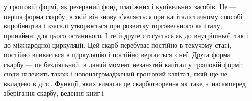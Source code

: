 \parcont{}  %
у грошовій формі, як резервний фонд платіжних і купівельних
засобів. Це — перша форма скарбу, в якій він знову з’являється
при капіталістичному способі виробництва і взагалі утворюється
при розвитку торговельного капіталу, принаймні для цього
останнього. І те й друге стосується як до внутрішньої, так і до
міжнародної циркуляції. Цей скарб перебуває постійно в текучому
стані, постійно вливається в циркуляцію і постійно вертається
з неї. Друга форма скарбу — це бездіяльний, в даний
момент незанятий капітал у грошовій формі; сюди належить
також і новонагромаджений грошовий капітал, який ще не
вкладено в діло. Функції, яких вимагає це скарботворення як
таке, є насамперед зберігання скарбу, ведення книг і~

